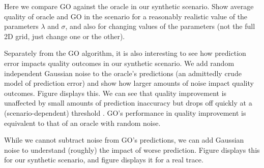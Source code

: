 \fillme



Here we compare GO against the oracle in our synthetic scenario.  Show average quality of oracle and GO in the scenario for a reasonably realistic value of the parameters $\lambda$ and $\sigma$, and also for changing values of the parameters (not the full 2D grid, just change one or the other). \fillme


Separately from the GO algorithm, it is also interesting to see how prediction error impacts quality outcomes in our synthetic scenario.  We add random independent Gaussian noise to the oracle's predictions (an admittedly crude model of prediction error) and show how larger amounts of noise impact quality outcomes.  Figure \fillme displays this.  We can see that quality improvement is unaffected by small amounts of prediction inaccuracy but drops off quickly at a (scenario-dependent) threshold \fillme.  GO's performance in quality improvement is equivalent to that of an oracle with \fillme random noise.

While we cannot subtract noise from GO's predictions, we can add Gaussian noise to understand (roughly) the impact of worse prediction.  Figure \fillme displays this for our synthetic scenario, and figure \fillme displays it for a real trace.